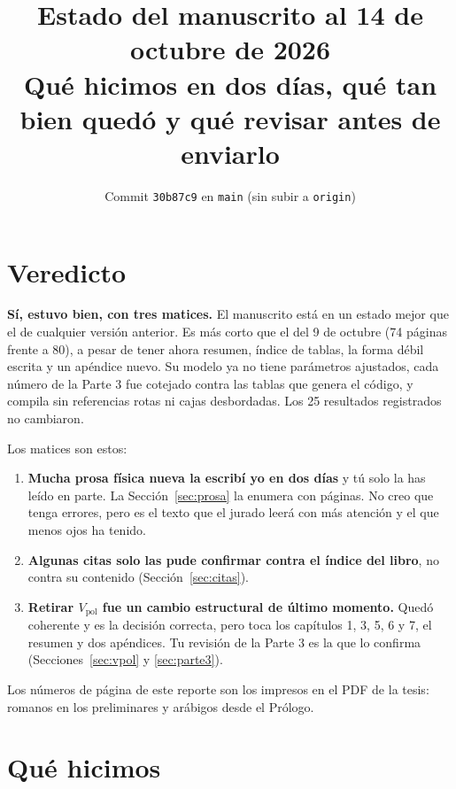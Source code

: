 \documentclass[11pt,a4paper]{article}
\title{Estado del manuscrito al 14 de octubre de 2026\\[0.3em]
\large Qué hicimos en dos días, qué tan bien quedó y qué revisar antes de enviarlo}
\author{}
\date{Commit \texttt{30b87c9} en \texttt{main} (sin subir a \texttt{origin})}
\begin{document}
\maketitle
\vspace{-2.5em}

\section*{Veredicto}

\textbf{Sí, estuvo bien, con tres matices.} El manuscrito está en un estado mejor que el de cualquier
versión anterior. Es más corto que el del 9 de octubre (74 páginas frente a 80), a pesar de tener
ahora resumen, índice de tablas, la forma débil escrita y un apéndice nuevo. Su modelo ya no tiene
parámetros ajustados, cada número de la Parte 3 fue cotejado contra las tablas que genera el código,
y compila sin referencias rotas ni cajas desbordadas. Los 25 resultados registrados no cambiaron.

Los matices son estos:

\begin{enumerate}
\item \textbf{Mucha prosa física nueva la escribí yo en dos días} y tú solo la has leído en parte.
La Sección~\ref{sec:prosa} la enumera con páginas. No creo que tenga errores, pero es el texto que
el jurado leerá con más atención y el que menos ojos ha tenido.
\item \textbf{Algunas citas solo las pude confirmar contra el índice del libro}, no contra su
contenido (Sección~\ref{sec:citas}).
\item \textbf{Retirar $V_{\text{pol}}$ fue un cambio estructural de último momento.} Quedó
coherente y es la decisión correcta, pero toca los capítulos 1, 3, 5, 6 y 7, el resumen y dos
apéndices. Tu revisión de la Parte 3 es la que lo confirma (Secciones~\ref{sec:vpol} y \ref{sec:parte3}).
\end{enumerate}

Los números de página de este reporte son los impresos en el PDF de la tesis: romanos en los
preliminares y arábigos desde el Prólogo.

\tableofcontents

\section{Qué hicimos}
\end{document}
